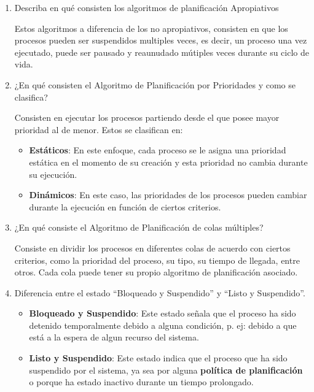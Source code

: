 \documentclass[12pt, a4paper]{article} %
\begin{document}
\begin{enumerate}
	\item Describa en qué consisten los algoritmos de planificación Apropiativos
	
	Estos algoritmos a diferencia de los no apropiativos, consisten en que los procesos pueden ser suspendidos multiples veces, es decir, un proceso una vez ejecutado, puede ser pausado y reaunudado mútiples veces durante su ciclo de vida.

	\item ¿En qué consisten el Algoritmo de Planificación por Prioridades y como se clasifica?
	
	Consisten en ejecutar los procesos partiendo desde el que posee mayor prioridad al de menor. Estos se clasifican en:

	\begin{itemize}
		\item \textbf{Estáticos}: En este enfoque, cada proceso se le asigna una prioridad estática en el momento de su creación y esta prioridad no cambia durante su ejecución.
		\item \textbf{Dinámicos}: En este caso, las prioridades de los procesos pueden cambiar durante la ejecución en función de ciertos criterios.
	\end{itemize}
	
	\item ¿En qué consiste el Algoritmo de Planificación de colas múltiples?
	
	Consiste en dividir los procesos en diferentes colas de acuerdo con ciertos criterios, como la prioridad del proceso, su tipo, su tiempo de llegada, entre otros. Cada cola puede tener su propio algoritmo de planificación asociado.

	\item Diferencia entre el estado “Bloqueado y Suspendido” y “Listo y Suspendido”.
	
	\begin{itemize}
		\item \textbf{Bloqueado y Suspendido}: Este estado señala que el proceso ha sido detenido temporalmente debido a alguna condición, p. ej: debido a que está a la espera de algun recurso del sistema.
		\item \textbf{Listo y Suspendido}: Este estado indica que el proceso que ha sido suspendido por el sistema, ya sea por alguna \textbf{política de planificación} o porque ha estado inactivo durante un tiempo prolongado.
	\end{itemize}


\end{enumerate}
\end{document}

